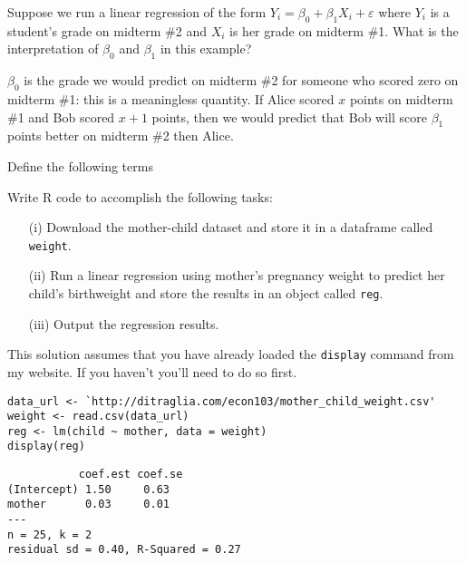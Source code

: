 \documentclass[addpoints,12pt]{exam}
\begin{document}
\begin{questions}
\question Suppose we run a linear regression of the form $Y_i = \beta_0 + \beta_1 X_i + \varepsilon$ where $Y_i$ is a student's grade on midterm \#2 and $X_i$ is her grade on midterm \#1.
What is the interpretation of $\beta_0$ and $\beta_1$ in this example?
\begin{solution}
  $\beta_0$ is the grade we would predict on midterm \#2 for someone who scored zero on midterm \#1: this is a meaningless quantity.
  If Alice scored $x$ points on midterm \#1 and Bob scored $x+1$ points, then we would predict that Bob will score $\beta_1$ points better on midterm \#2 then Alice.
\end{solution}

\question Define the following terms


\question Write R code to accomplish the following tasks: 
\begin{enumerate} 
  \item[(i)] Download the mother-child dataset and store it in a dataframe called \texttt{weight}.
  \item[(ii)] Run a linear regression using mother's pregnancy weight to predict her child's birthweight and store the results in an object called \texttt{reg}.
  \item[(iii)] Output the regression results. 
\end{enumerate}
\begin{solution}
  This solution assumes that you have already loaded the \texttt{display} command from my website. If you haven't you'll need to do so first.
\begin{verbatim}
data_url <- `http://ditraglia.com/econ103/mother_child_weight.csv'
weight <- read.csv(data_url)
reg <- lm(child ~ mother, data = weight)
display(reg)
\end{verbatim}
\end{solution}

\begin{verbatim}
           coef.est coef.se
(Intercept) 1.50     0.63   
mother      0.03     0.01   
---
n = 25, k = 2
residual sd = 0.40, R-Squared = 0.27
\end{verbatim}


\end{questions}
\end{document}
